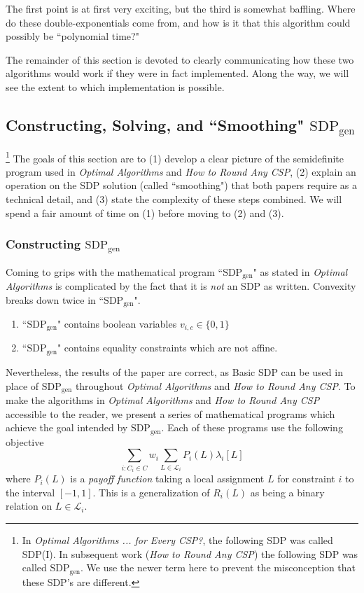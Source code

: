 \documentclass[letterpaper, 12pt]{article}
\numberwithin{equation}{section}
\begin{document}
The first point is at first very exciting, but the third is somewhat baffling. Where do these double-exponentials come from, and how is it that this algorithm could possibly be ``polynomial time?"

The remainder of this section is devoted to clearly communicating how these two algorithms would work if they were in fact implemented. Along the way, we will see the extent to which implementation is possible.
\subsection{Constructing, Solving, and ``Smoothing" $\text{SDP}_{\text{gen}}$}\footnote{In \textit{Optimal Algorithms ... for Every CSP?}, the following SDP was called SDP(I). In subsequent work (\textit{How to Round Any CSP}) the following SDP was called $\text{SDP}_{\text{gen}}$. We use the newer term here to prevent the misconception that these SDP's are different.
}
The goals of this section are to (1) develop a clear picture of the semidefinite program used in \textit{Optimal Algorithms} and \textit{How to Round Any CSP}, (2) explain an operation on the SDP solution (called ``smoothing") that both papers require as a technical detail, and (3) state the complexity of these steps combined. We will spend a fair amount of time on (1) before moving to (2) and (3).
\subsubsection{Constructing $\text{SDP}_{\text{gen}}$}
Coming to grips with the mathematical program ``$\text{SDP}_{\text{gen}}$" as stated in \textit{Optimal Algorithms} is complicated by the fact that it is \textit{not} an SDP as written. Convexity breaks down twice in ``$\text{SDP}_{\text{gen}}$".
\begin{enumerate}
\item ``$\text{SDP}_{\text{gen}}$" contains boolean variables $v_{i,c} \in \{0,1\}$
\item ``$\text{SDP}_{\text{gen}}$" contains equality constraints which are not affine.
\end{enumerate}
Nevertheless, the results of the paper are correct, as Basic SDP can be used in place of $\text{SDP}_{\text{gen}}$ throughout \textit{Optimal Algorithms} and \textit{How to Round Any CSP}. To make the algorithms in \textit{Optimal Algorithms} and \textit{How to Round Any CSP} accessible to the reader, we present a series of mathematical programs which achieve the goal intended by $\text{SDP}_{\text{gen}}$. Each of these programs use the following objective
\begin{equation}
\sum_{i : C_i \in C} w_i \sum_{L \in \mathcal{L}_i} P_i(L) \lambda_i[L]
\end{equation}
where $P_i(L)$ is a \textit{payoff function} taking a local assignment $L$ for constraint $i$ to the interval $[-1,1]$. This is a generalization of $R_i(L)$ as being a binary relation on $L \in \mathcal{L}_i$.
\end{document}
